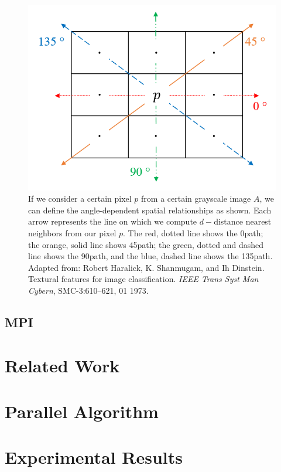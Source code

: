 \documentclass{article}
\begin{document}
    \begin{figure}
      \includegraphics[width=\linewidth]{direction_fig.PNG}
      \caption{If we consider a certain pixel $p$ from a certain grayscale image $A$, we can define the angle-dependent spatial relationships as shown. Each arrow represents the line on which we compute $d-$distance nearest neighbors from our pixel $p$. The red, dotted line shows the 0\textdegree  path; the orange, solid line shows 45\textdegree  path; the green, dotted and dashed line shows the 90\textdegree  path, and the blue, dashed line shows the 135\textdegree  path. Adapted from: Robert Haralick, K. Shanmugam, and Ih Dinstein. Textural features for image classification. \textit{IEEE Trans Syst Man Cybern}, SMC-3:610–621, 01 1973. }
      \label{fig:directions}
    \end{figure}
    
\subsection{MPI}
   
\section{Related Work}

\section{Parallel Algorithm}

\section{Experimental Results}
\end{document}
